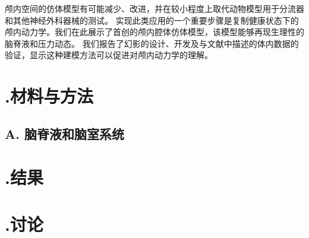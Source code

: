 \documentclass[12pt]{article}
\begin{document}
颅内空间的仿体模型有可能减少、改进，并在较小程度上取代动物模型用于分流器和其他神经外科器械的测试。
实现此类应用的一个重要步骤是复制健康状态下的颅内动力学。我们在此展示了首创的颅内腔体仿体模型，该模型能够再现生理性的脑脊液和压力动态。
我们报告了幻影的设计、开发及与文献中描述的体内数据的验证，显示这种建模方法可以促进对颅内动力学的理解。

\section*{\uppercase\expandafter{}.材料与方法}

\subsection*{A. 脑脊液和脑室系统}

\section*{\uppercase\expandafter{}.结果}

\section*{\uppercase\expandafter{}.讨论}
\end{document}
